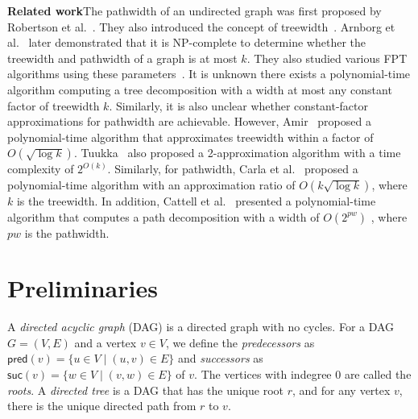 \documentclass[runningheads]{llncs}
\theoremstyle{plain}
\theoremstyle{definition}
\begin{document}
\vspace{4mm}
\noindent
\textbf{Related work}\quad The pathwidth of an undirected graph was first proposed by Robertson et al.~\cite{art1}. They also introduced the concept of treewidth~\cite{art2}. Arnborg et al.~\cite{art3} later demonstrated that it is NP-complete to determine whether the treewidth and pathwidth of a graph is at most \(k\). They also studied various FPT algorithms using these parameters~\cite{art4}. It is unknown there exists a polynomial-time algorithm computing a tree decomposition with a width at most any constant factor of treewidth $k$. Similarly, it is also unclear whether constant-factor approximations for pathwidth are achievable. However, Amir~\cite{art5} proposed a polynomial-time algorithm that approximates treewidth within a factor of $O(\sqrt{\log k})$. Tuukka~\cite{art6} also proposed a 2-approximation algorithm with a time complexity of $2^{O(k)}$. Similarly, for pathwidth, Carla et al.~\cite{art7} proposed a polynomial-time algorithm with an approximation ratio of $O(k\sqrt{\log k})$, where \( k \) is the treewidth. In addition, Cattell et al.~\cite{art8} presented a polynomial-time algorithm that computes a path decomposition with a width of $O(2^{pw})$ , where $pw$ is the pathwidth.




\section{Preliminaries}\label{chapter2}


A \emph{directed acyclic graph} (DAG) is a directed graph with no cycles. For a DAG $G = (V, E)$ and a vertex $v \in V$, we define the \emph{predecessors} as $\mathsf{pred}(v) = \{ u \in V \mid (u, v) \in E\}$ and \emph{successors} as $\mathsf{suc}(v) = \{ w \in V \mid (v, w) \in E\}$ of $v$. The vertices with indegree 0 are called the \emph{roots}.
A \emph{directed tree} is a DAG that has the unique root $r$, and for any vertex $v$, there is the unique directed path from $r$ to $v$.
   
\end{document}
